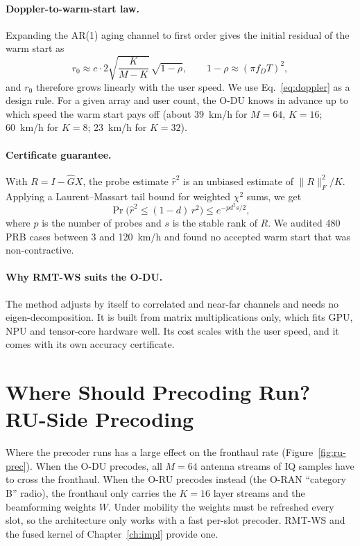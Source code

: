 \paragraph{Doppler-to-warm-start law.} Expanding the AR(1) aging channel to first order gives the initial residual of the warm start as
\begin{equation}
  r_0 \approx c\cdot 2\sqrt{\frac{K}{M-K}}\,\sqrt{1-\rho}, \qquad 1-\rho \approx (\pi f_D T)^2,
  \label{eq:doppler}
\end{equation}
and $r_0$ therefore grows linearly with the user speed. We use Eq.~\eqref{eq:doppler} as a design rule. For a given array and user count, the O-DU knows in advance up to which speed the warm start pays off (about 39~km/h for $M=64$, $K=16$; 60~km/h for $K=8$; 23~km/h for $K=32$).

\paragraph{Certificate guarantee.} With $R = I - \hat G X$, the probe estimate $\hat r^2$ is an unbiased estimate of $\|R\|_F^2/K$. Applying a Laurent--Massart tail bound for weighted $\chi^2$ sums, we get
\begin{equation}
  \Pr\big(\hat r^2 \le (1-d)\, r^2\big) \le e^{-p d^2 s/2},
\end{equation}
where $p$ is the number of probes and $s$ is the stable rank of $R$. We audited 480 PRB cases between 3 and 120~km/h and found no accepted warm start that was non-contractive.

\paragraph{Why RMT-WS suits the O-DU.} The method adjusts by itself to correlated and near-far channels and needs no eigen-decomposition. It is built from matrix multiplications only, which fits GPU, NPU and tensor-core hardware well. Its cost scales with the user speed, and it comes with its own accuracy certificate.

\section{Where Should Precoding Run? RU-Side Precoding}
\label{sec:ru-precoding}

Where the precoder runs has a large effect on the fronthaul rate (Figure~\ref{fig:ru-prec}). When the O-DU precodes, all $M=64$ antenna streams of IQ samples have to cross the fronthaul. When the O-RU precodes instead (the O-RAN ``category B'' radio), the fronthaul only carries the $K=16$ layer streams and the beamforming weights $W$. Under mobility the weights must be refreshed every slot, so the architecture only works with a fast per-slot precoder. RMT-WS and the fused kernel of Chapter~\ref{ch:impl} provide one.

